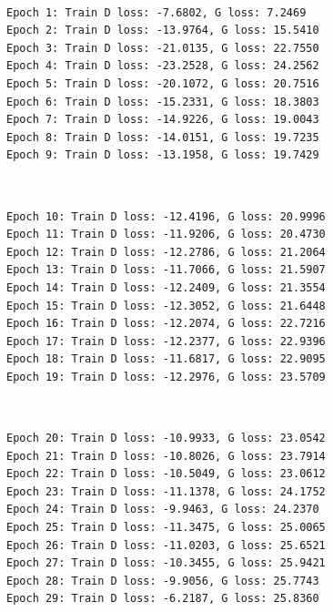 \documentclass[11pt]{article}
\begin{document}
    \begin{center}
    \end{center}
    { \hspace*{\fill} \\}
    
    \begin{Verbatim}[commandchars=\\\{\}]
Epoch 1: Train D loss: -7.6802, G loss: 7.2469
Epoch 2: Train D loss: -13.9764, G loss: 15.5410
Epoch 3: Train D loss: -21.0135, G loss: 22.7550
Epoch 4: Train D loss: -23.2528, G loss: 24.2562
Epoch 5: Train D loss: -20.1072, G loss: 20.7516
Epoch 6: Train D loss: -15.2331, G loss: 18.3803
Epoch 7: Train D loss: -14.9226, G loss: 19.0043
Epoch 8: Train D loss: -14.0151, G loss: 19.7235
Epoch 9: Train D loss: -13.1958, G loss: 19.7429

    \end{Verbatim}

    \begin{center}
    \end{center}
    { \hspace*{\fill} \\}
    
    \begin{Verbatim}[commandchars=\\\{\}]
Epoch 10: Train D loss: -12.4196, G loss: 20.9996
Epoch 11: Train D loss: -11.9206, G loss: 20.4730
Epoch 12: Train D loss: -12.2786, G loss: 21.2064
Epoch 13: Train D loss: -11.7066, G loss: 21.5907
Epoch 14: Train D loss: -12.2409, G loss: 21.3554
Epoch 15: Train D loss: -12.3052, G loss: 21.6448
Epoch 16: Train D loss: -12.2074, G loss: 22.7216
Epoch 17: Train D loss: -12.2377, G loss: 22.9396
Epoch 18: Train D loss: -11.6817, G loss: 22.9095
Epoch 19: Train D loss: -12.2976, G loss: 23.5709

    \end{Verbatim}

    \begin{center}
    \end{center}
    { \hspace*{\fill} \\}
    
    \begin{Verbatim}[commandchars=\\\{\}]
Epoch 20: Train D loss: -10.9933, G loss: 23.0542
Epoch 21: Train D loss: -10.8026, G loss: 23.7914
Epoch 22: Train D loss: -10.5049, G loss: 23.0612
Epoch 23: Train D loss: -11.1378, G loss: 24.1752
Epoch 24: Train D loss: -9.9463, G loss: 24.2370
Epoch 25: Train D loss: -11.3475, G loss: 25.0065
Epoch 26: Train D loss: -11.0203, G loss: 25.6521
Epoch 27: Train D loss: -10.3455, G loss: 25.9421
Epoch 28: Train D loss: -9.9056, G loss: 25.7743
Epoch 29: Train D loss: -6.2187, G loss: 25.8360

    \end{Verbatim}
\end{document}

